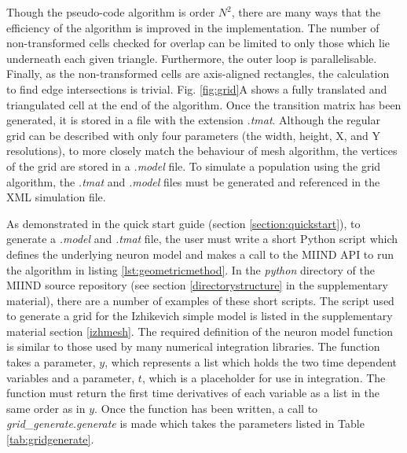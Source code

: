 \documentclass[utf8]{frontiersSCNS} %
\begin{document}
Though the pseudo-code algorithm is order $N^2$, there are many ways that the efficiency of the algorithm is improved in the implementation. The number of non-transformed cells checked for overlap can be limited to only those which lie underneath each given triangle. Furthermore, the outer loop is parallelisable. Finally, as the non-transformed cells are axis-aligned rectangles, the calculation to find edge intersections is trivial. Fig. \ref{fig:grid}A shows a fully translated and triangulated cell at the end of the algorithm. Once the transition matrix has been generated, it is stored in a file with the extension \textit{.tmat}. Although the regular grid can be described with only four parameters (the width, height, X, and Y resolutions), to more closely match the behaviour of mesh algorithm, the vertices of the grid are stored in a \textit{.model} file. To simulate a population using the grid algorithm, the \textit{.tmat} and \textit{.model} files must be generated and referenced in the XML simulation file.

As demonstrated in the quick start guide (section \ref{section:quickstart}), to generate a \textit{.model} and \textit{.tmat} file, the user must write a short Python script which defines the underlying neuron model and makes a call to the MIIND API to run the algorithm in listing \ref{lst:geometricmethod}. In the \textit{python} directory of the MIIND source repository (see section \ref{directorystructure} in the supplementary material), there are a number of examples of these short scripts. The script used to generate a grid for the Izhikevich simple model is listed in the supplementary material section \ref{izhmesh}. The required definition of the neuron model function is similar to those used by many numerical integration libraries. The function takes a parameter, $y$, which represents a list which holds the two time dependent variables and a parameter, $t$, which is a placeholder for use in integration. The function must return the first time derivatives of each variable as a list in the same order as in $y$. Once the function has been written, a call to \textit{grid\_generate.generate} is made which takes the parameters listed in Table \ref{tab:gridgenerate}. 
\end{document}
